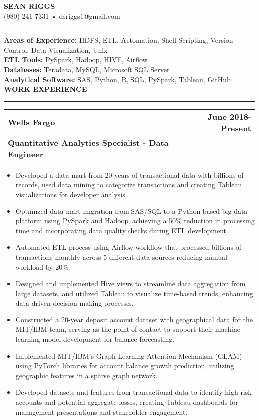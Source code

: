 \documentclass[a4paper,10pt]{article}
\begin{document}
\begin{center}
\textbf{\Large SEAN RIGGS}\\
(980) 241-7331 • dsriggs1@gmail.com\vspace{1mm}\\
\hrule height 2pt
\vspace{2mm}
\end{center}

\noindent
\textbf{Areas of Experience:}
HDFS,  ETL, Automation, Shell Scripting, Version Control, Data Visualization, Unix\\
\textbf{ETL Tools:} PySpark, Hadoop, HIVE, Airflow \\
\textbf{Databases:} Teradata, MySQL, Microsoft SQL Server\\
\textbf{Analytical Software:} SAS, Python, R, SQL, PySpark, Tableau, GitHub\\

\noindent
\textbf{WORK EXPERIENCE}\vspace{-3mm}\\
\hrule height 2pt
\vspace{2mm}
\noindent
\begin{tabular}{p{} r}
   \textbf{Wells Fargo} & \textbf{June 2018-Present }\\
    \textbf{Quantitative Analytics Specialist - Data Engineer} & \\    
\end{tabular}
\begin{itemize}
  \item Developed a data mart from 20 years of transactional data with billions of records, used data mining to categorize transactions and creating Tableau visualizations for developer analysis.
  \item Optimized data mart migration from SAS/SQL to a Python-based big-data platform using PySpark and Hadoop, achieving a 50\% reduction in processing time and incorporating data quality checks during ETL development.
  \item Automated ETL process using Airflow workflow that processed billions of transactions monthly across 5 different data sources reducing manual workload by 20\%.
  \item Designed and implemented Hive views to streamline data aggregation from large datasets, and utilized Tableau to visualize time-based trends, enhancing data-driven decision-making processes.
  \item Constructed a 20-year deposit account dataset with geographical data for the MIT/IBM team, serving as the point of contact to support their machine learning model development for balance forecasting.
  \item Implemented MIT/IBM's Graph Learning Attention Mechanism (GLAM) using PyTorch libraries for account balance growth prediction, utilizing geographic features in a sparse graph network.
  \item Developed datasets and features from transactional data to identify high-risk accounts and potential aggregate losses, creating Tableau dashboards for management presentations and stakeholder engagement.
\end{itemize}
\end{document}
